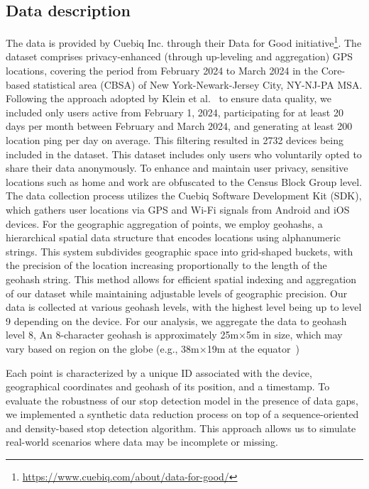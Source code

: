 \documentclass{article}
\begin{document}
\subsection{Data description}
The data is provided by Cuebiq Inc. through their Data for Good initiative\footnote{\url{https://www.cuebiq.com/about/data-for-good/}}.
The dataset comprises privacy-enhanced (through up-leveling and aggregation) GPS locations, covering the period from February 2024 to March 2024 in the Core-based statistical area (CBSA) of New York-Newark-Jersey City, NY-NJ-PA MSA. Following the approach adopted by Klein et al.~\citep{Klein2023} to ensure data quality, we included only users active from February 1, 2024, participating for at least 20 days per month between February and March 2024, and generating at least 200 location ping per day on average. This filtering resulted in 2732 devices being included in the dataset. This dataset includes only users who voluntarily opted to share their data anonymously. To enhance and maintain user privacy, sensitive locations such as home and work are obfuscated to the Census Block Group level. The data collection process utilizes the Cuebiq Software Development Kit (SDK), which gathers user locations via GPS and Wi-Fi signals from Android and iOS devices.
For the geographic aggregation of points, we employ geohashs, a hierarchical spatial data structure that encodes locations using alphanumeric strings. This system subdivides geographic space into grid-shaped buckets, with the precision of the location increasing proportionally to the length of the geohash string. This method allows for efficient spatial indexing and aggregation of our dataset while maintaining adjustable levels of geographic precision.
Our data is collected at various geohash levels, with the highest level being up to level 9 depending on the device.
For our analysis, we aggregate the data to geohash level 8,  An 8-character geohash is approximately 25m×5m in size, which may vary based on region on the globe (e.g., 38m×19m at the equator~\citep{geohash})

Each point is characterized by a unique ID associated with the device, geographical coordinates and geohash of its position, and a timestamp.
To evaluate the robustness of our stop detection model in the presence of data gaps, we implemented a synthetic data reduction process on top of a sequence-oriented and density-based stop detection algorithm. This approach allows us to simulate real-world scenarios where data may be incomplete or missing.
\end{document}
